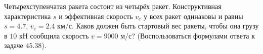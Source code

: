 Четырехступенчатая ракета состоит из четырёх ракет.
Конструктивная характеристика $s$ и эффективная скорость $v _e$
у всех ракет одинаковы и равны $s = 4.7$, $v _e = 2.4$ км/с.
Каков должен быть стартовый вес ракеты, чтобы она грузу в $10$ кН
сообщила скорость $v = 9000$ м/с?
(Воспользоваться формулами ответа к задаче $45.38$).
